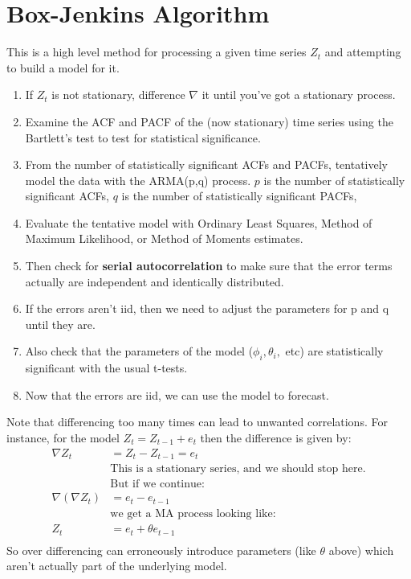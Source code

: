 \section{Box-Jenkins Algorithm}

This is a high level method for processing a given time series $Z_{t}$ and
attempting to build a model for it.
\begin{enumerate}
    \item If $Z_{t}$ is not stationary, difference $\nabla $ it until you've
        got a stationary process.
    \item Examine the ACF and PACF of the (now stationary) time series using
        the Bartlett's test to test for statistical significance.
    \item From the number of statistically significant ACFs and PACFs,
        tentatively model the data with the ARMA(p,q) process. $p$ is the
        number of statistically significant ACFs, $q$ is the number of
        statistically significant PACFs, 
    \item Evaluate the tentative model with Ordinary Least Squares, Method
        of Maximum Likelihood, or Method of Moments estimates.
    \item Then check for \textbf{serial autocorrelation} to make sure that the
        error terms actually are independent and identically distributed.
    \item If the errors aren't iid, then we need to adjust the parameters for p
        and q until they are.
    \item Also check that the parameters of the model ($\phi_{i}, \theta_{i}, $
        etc) are statistically significant with the usual t-tests.
    \item Now that the errors are iid, we can use the model to forecast.
\end{enumerate}


Note that differencing too many times can lead to unwanted correlations.  For
instance, for the model $Z_{t} = Z_{t-1} + e_{t}$ then the difference is given
by:
\begin{equation*}
    \begin{aligned}
        \nabla Z_{t} &= Z_{t} - Z_{t-1} = e_{t} \\
        &\text{This is a stationary series, and we should stop here.}\\
        &\text{But if we continue:}\\
        \nabla (\nabla Z_{t}) &= e_{t} - e_{t-1}\\
        &\text{we get a MA process looking like:}\\
        Z_{t} &= e_{t} + \theta e_{t-1} \\
    \end{aligned}
\end{equation*}
So over differencing can erroneously introduce parameters (like $\theta $
above) which aren't actually part of the underlying model.


